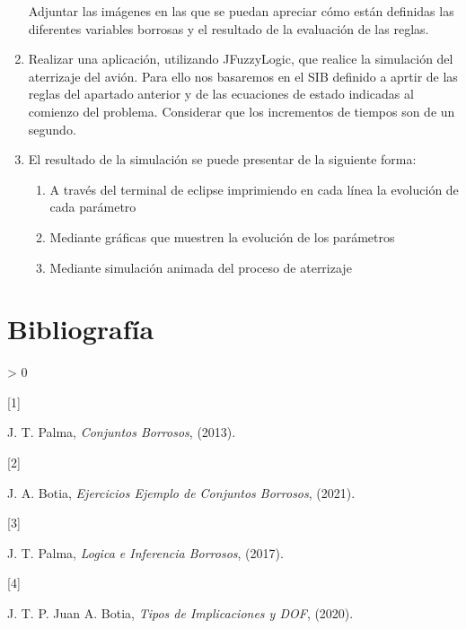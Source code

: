 \documentclass[
]{article}
\newlength{\cslhangindent}
\newlength{\csllabelwidth}
\newenvironment{CSLReferences}[2] %
 {%
  \setlength{\parindent}{0pt}
  \ifodd #1 \everypar{\setlength{\hangindent}{\cslhangindent}}\ignorespaces\fi
  \ifnum #2 > 0
  \setlength{\parskip}{#2\baselineskip}
  \fi
 }%
 {}
\newcommand{\CSLLeftMargin}[1]{\parbox[t]{\csllabelwidth}{#1}}
\newcommand{\CSLRightInline}[1]{\parbox[t]{\linewidth - \csllabelwidth}{#1}\break}
\begin{document}
\begin{enumerate}
  Adjuntar las imágenes en las que se puedan apreciar cómo están
  definidas las diferentes variables borrosas y el resultado de la
  evaluación de las reglas.
\item
  Realizar una aplicación, utilizando JFuzzyLogic, que realice la
  simulación del aterrizaje del avión. Para ello nos basaremos en el SIB
  definido a aprtir de las reglas del apartado anterior y de las
  ecuaciones de estado indicadas al comienzo del problema. Considerar
  que los incrementos de tiempos son de un segundo.
\item
  El resultado de la simulación se puede presentar de la siguiente
  forma:

  \begin{enumerate}
  \def\labelenumii{\alph{enumii}.}
  \item
    A través del terminal de eclipse imprimiendo en cada línea la
    evolución de cada parámetro
  \item
    Mediante gráficas que muestren la evolución de los parámetros
  \item
    Mediante simulación animada del proceso de aterrizaje
  \end{enumerate}
\end{enumerate}

\newpage

\hypertarget{bibliografuxeda}{%
\section{Bibliografía}\label{bibliografuxeda}}

\hypertarget{refs}{}
\begin{CSLReferences}{0}{0}
\leavevmode\hypertarget{ref-PalmaConjuntosBorrosos}{}%
\CSLLeftMargin{{[}1{]} }
\CSLRightInline{J. T. Palma, \emph{Conjuntos Borrosos}, (2013).}

\leavevmode\hypertarget{ref-BotiaConjuntosBorrosos}{}%
\CSLLeftMargin{{[}2{]} }
\CSLRightInline{J. A. Botia, \emph{Ejercicios Ejemplo de Conjuntos
Borrosos}, (2021).}

\leavevmode\hypertarget{ref-PalmaLogicaBorrosa}{}%
\CSLLeftMargin{{[}3{]} }
\CSLRightInline{J. T. Palma, \emph{Logica e Inferencia Borrosos},
(2017).}

\leavevmode\hypertarget{ref-BotiaPalmaImplicaciones}{}%
\CSLLeftMargin{{[}4{]} }
\CSLRightInline{J. T. P. Juan A. Botia, \emph{Tipos de Implicaciones y
DOF}, (2020).}

\end{CSLReferences}
\end{document}
